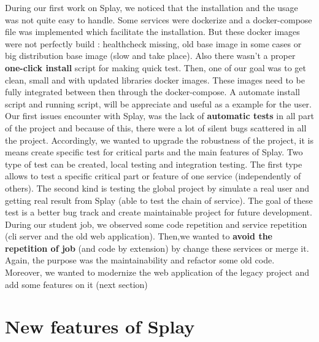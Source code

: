 \documentclass{eplmastersthesis}
\begin{document}
      During our first work on Splay, we noticed that the installation and the usage was not quite easy to handle. Some services were dockerize and a docker-compose file was implemented which facilitate the installation. But these docker images were not perfectly build : healthcheck missing, old base image in some cases or big distribution base image (slow and take place). Also there wasn't a proper \textbf{one-click install} script for making quick test. Then, one of our goal was to get clean, small and with updated libraries docker images. These images need to be fully integrated between then through the docker-compose. A automate install script and running script, will be appreciate and useful as a example for the user.\\
      
      Our first issues encounter with Splay, was the lack of \textbf{automatic tests} in all part of the project and because of this, there were a lot of silent bugs scattered in all the project. Accordingly, we wanted to upgrade the robustness of the project, it is means create specific test for critical parts and the main features of Splay. Two type of test can be created, local testing and integration testing. The first type allows to test a specific critical part or feature of one service (independently of others). The second kind is testing the global project by simulate a real user and getting real result from Splay (able to test the chain of service). The goal of these test is a better bug track and create maintainable project for future development.\\
      
      During our student job, we observed some code repetition and service repetition (cli server and the old web application). Then,we wanted to \textbf{avoid the repetition of job} (and code by extension) by change these services or merge it. Again, the purpose was the maintainability and refactor some old code. Moreover, we wanted to modernize the web application of the legacy project and add some features on it (next section)
     
      
    \section{New features of Splay}
\end{document}
